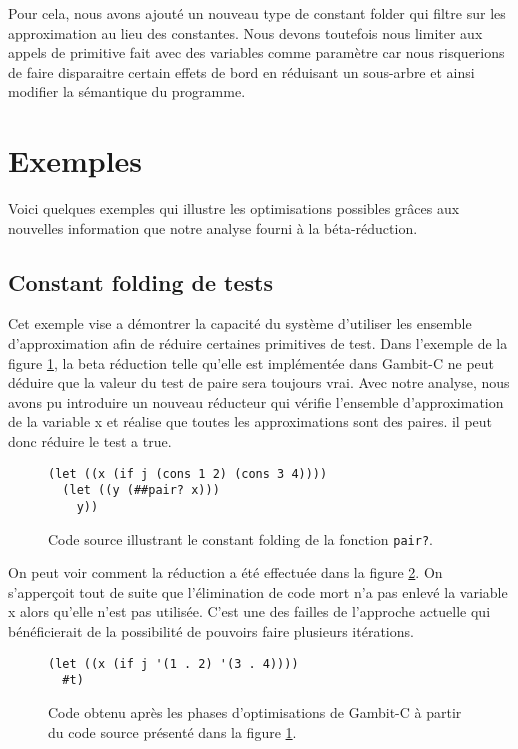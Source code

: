 Pour cela, nous avons ajouté un nouveau type de constant folder qui
filtre sur les approximation au lieu des constantes.  Nous devons
toutefois nous limiter aux appels de primitive fait avec des variables
comme paramètre car nous risquerions de faire disparaitre certain
effets de bord en réduisant un sous-arbre et ainsi modifier la
sémantique du programme.

\clearpage

\section{Exemples}

Voici quelques exemples qui illustre les optimisations possibles grâces aux
nouvelles information que notre analyse fourni à la béta-réduction.

\subsection{\og Constant folding \fg de tests}

Cet exemple vise a démontrer la capacité du système d'utiliser les
ensemble d'approximation afin de réduire certaines primitives de
test. Dans l'exemple de la figure \ref{cfa-ex1-source}, la beta
réduction telle qu'elle est implémentée dans Gambit-C ne peut déduire
que la valeur du test de paire sera toujours vrai.  Avec notre
analyse, nous avons pu introduire un nouveau réducteur qui vérifie
l'ensemble d'approximation de la variable x et réalise que toutes les
approximations sont des paires. il peut donc réduire le test a true.

  \begin{figure}[htbp!]
    \begin{lstlisting}
(let ((x (if j (cons 1 2) (cons 3 4))))
  (let ((y (##pair? x)))
    y))
    \end{lstlisting}
    \caption{Code source illustrant le \og constant folding \fg de la
      fonction \texttt{pair?}.}
    \label{cfa-ex1-source}
  \end{figure}

On peut voir comment la réduction a été effectuée dans la figure
\ref{cfa-ex1-out}. On s'apperçoit tout de suite que l'élimination de
code mort n'a pas enlevé la variable x alors qu'elle n'est pas
utilisée. C'est une des failles de l'approche actuelle qui
bénéficierait de la possibilité de pouvoirs faire plusieurs
itérations.

 \begin{figure}[htbp!]
    \begin{lstlisting}
(let ((x (if j '(1 . 2) '(3 . 4))))
  #t)
    \end{lstlisting}
    \caption{Code obtenu après les phases d'optimisations de Gambit-C à
      partir du code source présenté dans la figure \ref{cfa-ex1-source}.}
    \label{cfa-ex1-out}
  \end{figure}

